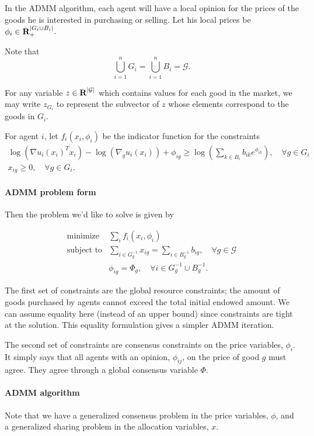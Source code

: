 \documentclass[12pt]{article}
\begin{document}
In the ADMM algorithm, each agent will have a local opinion for the prices
of the goods he is interested in purchasing or selling.
Let his local prices
be $\phi_i \in {\mbox{\bf R}}_+^{|G_i \cup B_i|}$.

Note that
\[
\bigcup_{i=1}^n G_i = \bigcup_{i=1}^n B_i = \mathcal{G}.
\]

For any variable $z \in {\mbox{\bf R}}^{|\mathcal{G}|}$ which contains values for
each good in the market, we may write $z_{G_i}$ to represent the subvector
of $z$ whose elements correspond to the goods in $G_i$.

For agent $i$, let $f_i(x_i, \phi_i)$ be the indicator function for the
constraints
\[
\begin{array}{c}
\log(\nabla u_i(x_i)^T x_i) - \log(\nabla_g u_i(x_i)) + \phi_{ig} \geq  \log\left(\sum\limits_{k \in B_i} b_{ik} e^{\phi_{ik}}\right),\quad \forall g \in G_i\\
x_{ig} \geq 0, \quad \forall g \in G_i.
\end{array}
\]

\paragraph{ADMM problem form} Then the problem we'd like to solve is given by

\[
\begin{array}{ll}
\mbox{minimize} & \sum_i f_i(x_i, \phi_i) \\
\mbox{subject to} & \sum\limits_{i \in G^{-1}_g} x_{ig} = \sum\limits_{i \in B^{-1}_g} b_{ig},\quad \forall g \in \mathcal{G}\\
& \phi_{ig} = \Phi_g,\quad \forall i \in G^{-1}_g \cup B^{-1}_g.
\end{array}
\]

The first set of constraints are the global resource constraints; the amount of
goods purchased by agents cannot exceed the total initial endowed amount.
We can assume equality here (instead of an upper bound)
since constraints are tight at the solution. This equality formulation gives
a simpler ADMM iteration.

The second set of constraints are consensus constraints on the price variables,
$\phi_i$. It simply says that all agents with an opinion, $\phi_{ij}$, on the price
of good $g$ must agree. They agree through a global consensus variable $\Phi$.


\paragraph{ADMM algorithm}
Note that we have a generalized consensus problem in the price variables,
$\phi$, and a generalized sharing problem in the allocation variables, $x$.
\end{document}
